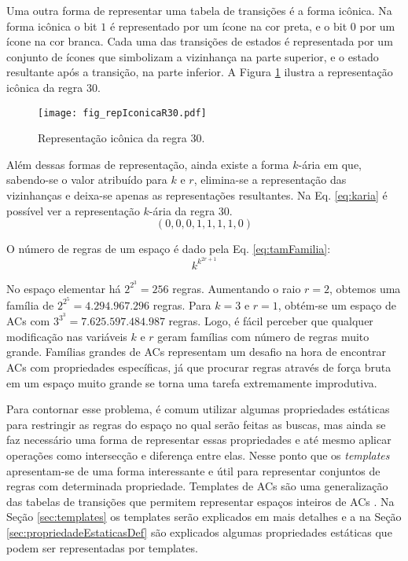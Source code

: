 Uma outra forma de representar uma tabela de transições é a forma icônica. Na forma icônica o bit $1$ é representado por um ícone na cor preta, e o bit $0$ por um ícone na cor branca. Cada uma das transições de estados é representada por um conjunto de ícones que simbolizam a vizinhança na parte superior, e o estado resultante após a transição, na parte inferior. A Figura \ref{fig:repIconicaR30} ilustra a representação icônica da regra 30.
	\begin{figure}[h!]
	  \centering
	  \texttt{[image: fig\_repIconicaR30.pdf]}
	  \caption{Representação icônica da regra 30.}
	  \label{fig:repIconicaR30}
	\end{figure}

Além dessas formas de representação, ainda existe a forma $k$-ária em que, sabendo-se o valor atribuído para $k$ e $r$, elimina-se a representação das vizinhanças e deixa-se apenas as representações resultantes. Na Eq. \eqref{eq:karia} é possível ver a representação $k$-ária da regra 30.
	\begin{equation}
	(0,0,0,1,1,1,1,0)
	\label{eq:karia}
	\end{equation}

O número de regras de um espaço é dado pela Eq. \eqref{eq:tamFamilia}:%
	\begin{equation}
	k^{k^{2r+1}}
	\label{eq:tamFamilia}
	\end{equation}

No espaço elementar há $2^{2^{3}} = 256$ regras. Aumentando o raio $r=2$, obtemos uma família de $2^{2^{5}} = 4.294.967.296$ regras. Para $k=3$ e $r=1$, obtém-se um espaço de ACs com $3^{3^{3}} = 7.625.597.484.987$ regras. Logo, é fácil perceber que qualquer modificação nas variáveis $k$ e $r$ geram famílias com número de regras muito grande. %
Famílias grandes de ACs representam um desafio na hora de encontrar ACs com propriedades específicas, já que procurar regras através de força bruta em um espaço muito grande se torna uma tarefa extremamente improdutiva. %

Para contornar esse problema, é comum utilizar algumas propriedades estáticas para restringir as regras do espaço no qual serão feitas as buscas, mas ainda se faz necessário uma forma de representar essas propriedades e até mesmo aplicar operações como intersecção e diferença entre elas. Nesse ponto que os \textit{templates} apresentam-se de uma forma interessante e útil para representar conjuntos de regras com determinada propriedade. Templates de ACs são uma generalização das tabelas de transições que permitem representar espaços inteiros de ACs \cite{Verardo2014}. Na Seção \ref{sec:templates} os templates serão explicados em mais detalhes e a na Seção \ref{sec:propriedadeEstaticasDef} são explicados algumas propriedades estáticas que podem ser representadas por templates. %